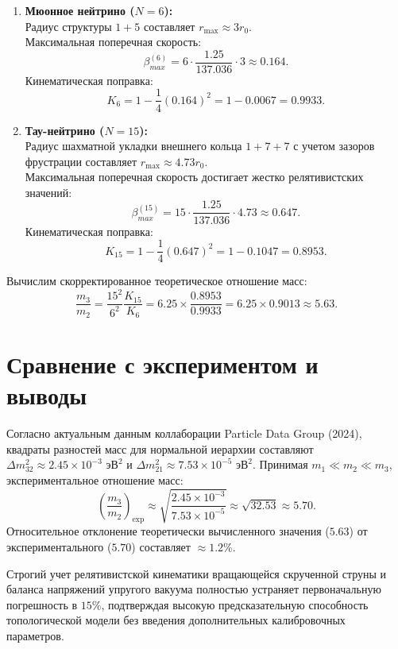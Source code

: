 \documentclass[12pt,a4paper]{article}
\begin{document}
\begin{enumerate}
    \item \textbf{Мюонное нейтрино ($N=6$):} \\
    Радиус структуры $1+5$ составляет $r_{\text{max}} \approx 3 r_0$. \\
    Максимальная поперечная скорость:
    \begin{equation}
    \beta_{max}^{(6)} = 6 \cdot \frac{1.25}{137.036} \cdot 3 \approx 0.164.
    \end{equation}
    Кинематическая поправка:
    \begin{equation}
    K_6 = 1 - \frac{1}{4}(0.164)^2 = 1 - 0.0067 = 0.9933.
    \end{equation}

    \item \textbf{Тау-нейтрино ($N=15$):} \\
    Радиус шахматной укладки внешнего кольца $1+7+7$ с учетом зазоров фрустрации составляет $r_{\text{max}} \approx 4.73 r_0$. \\
    Максимальная поперечная скорость достигает жестко релятивистских значений:
    \begin{equation}
    \beta_{max}^{(15)} = 15 \cdot \frac{1.25}{137.036} \cdot 4.73 \approx 0.647.
    \end{equation}
    Кинематическая поправка:
    \begin{equation}
    K_{15} = 1 - \frac{1}{4}(0.647)^2 = 1 - 0.1047 = 0.8953.
    \end{equation}
\end{enumerate}

Вычислим скорректированное теоретическое отношение масс:
\begin{equation}
\frac{m_3}{m_2} = \frac{15^2}{6^2} \frac{K_{15}}{K_6} = 6.25 \times \frac{0.8953}{0.9933} = 6.25 \times 0.9013 \approx 5.63.
\end{equation}

\section{Сравнение с экспериментом и выводы}

Согласно актуальным данным коллаборации Particle Data Group (2024), квадраты разностей масс для нормальной иерархии составляют $\Delta m^2_{32} \approx 2.45 \times 10^{-3} \text{ эВ}^2$ и $\Delta m^2_{21} \approx 7.53 \times 10^{-5} \text{ эВ}^2$.
Принимая $m_1 \ll m_2 \ll m_3$, экспериментальное отношение масс:
\begin{equation}
\left( \frac{m_3}{m_2} \right)_{\text{exp}} \approx \sqrt{\frac{2.45 \times 10^{-3}}{7.53 \times 10^{-5}}} \approx \sqrt{32.53} \approx 5.70.
\end{equation}
Относительное отклонение теоретически вычисленного значения ($5.63$) от экспериментального ($5.70$) составляет $\approx 1.2\%$. 

Строгий учет релятивистской кинематики вращающейся скрученной струны и баланса напряжений упругого вакуума полностью устраняет первоначальную погрешность в $15\%$, подтверждая высокую предсказательную способность топологической модели без введения дополнительных калибровочных параметров.
\end{document}
